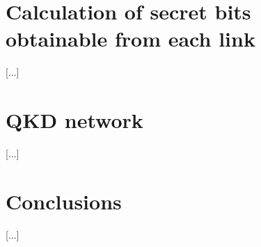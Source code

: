 \documentclass[twocolumn]{article}
\begin{document}
	\section{Calculation of secret bits obtainable from each link}
	[...]
	\section{QKD network}
	[...]
	\section{Conclusions}
	[...]
	
	
	
\end{document}
